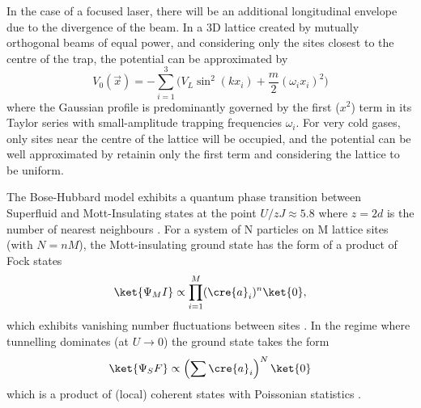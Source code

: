 	In the case of a focused laser, there will be an additional longitudinal envelope due to the divergence of the beam.
	In a 3D lattice created by mutually orthogonal beams of equal power, and considering only the sites closest to the centre of the trap, the potential can be approximated by 
	\begin{equation}
		V_0(\vec{x}) = -\sum_{i=1}^3\Big( V_{L} \sin^2(k x_i) + \frac{m}{2}(\omega_i x_i)^2\Big)
	\end{equation}
	where the Gaussian profile is predominantly governed by the first ($x^2$) term in its Taylor series with small-amplitude trapping frequencies $\omega_i$.	
	For very cold gases, only sites near the centre of the lattice will be occupied, and the potential can be well approximated by retainin only the first term and considering the lattice to be uniform.

	The Bose-Hubbard model exhibits a quantum phase transition between Superfluid and Mott-Insulating states at the point $U/zJ \approx 5.8$ where $z=2d$ is the number of nearest neighbours \cite{Jaksch98}.
	For a system of N particles on M lattice sites (with $N = nM$), the  Mott-insulating ground state has the form of a product of Fock states
	\begin{equation}
		\ket{\Psi_MI} \propto \prod_{i=1}^M (\cre{a}_i)^n\ket{0},
	\end{equation}
	which exhibits vanishing number fluctuations between sites \cite{Greiner01}.	
	In the regime where tunnelling dominates (at $U\rightarrow 0$) the ground state takes the form
	\begin{equation}
		\ket{\Psi_SF} \propto \left(\sum \cre{a}_i\right)^N\ket{0}
	\end{equation}
	which is a product of (local) coherent states with Poissonian statistics \cite{Greiner01}.
	
